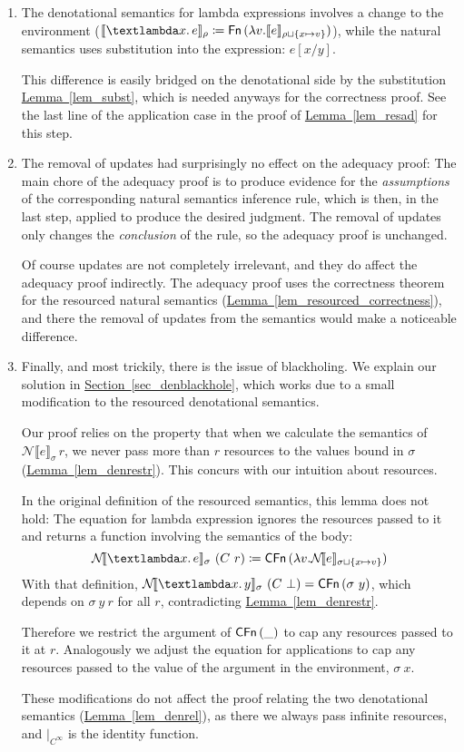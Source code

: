 \documentclass{jfp1}
\newcommand{\myref}[2]{\hyperref[#2]{#1~\ref*{#2}}}
\theoremstyle{nonumberbreak}
\newcommand{\sFn}[1]{\text{\textsf{Fn}}\,(#1)}
\newcommand{\sCFn}[1]{\text{\textsf{CFn}}\,(#1)}
\newcommand{\sLam}[2]{\text{\textlambda} #1.\, #2}
\newcommand{\dsem}[2]{\llbracket #1 \rrbracket_{#2}}
\newcommand{\dsemr}[2]{\mathcal N\!\llbracket #1 \rrbracket_{#2}}
\begin{document}
\begin{enumerate}
\item The denotational semantics for lambda expressions involves a change to the environment ($\dsem{\sLam x e}\rho \coloneqq \sFn{\lambda v. \dsem e {\rho \sqcup \{x \mapsto v\}}}$), while the natural semantics uses substitution into the expression: $e[x/y]$.

This difference is easily bridged on the denotational side by the substitution \myref{Lemma}{lem_subst}, which is needed anyways for the correctness proof. See the last line of the application case in the proof of \myref{Lemma}{lem_resad} for this step.

\item The removal of updates had surprisingly no effect on the adequacy proof: The main chore of the adequacy proof is to produce evidence for the \emph{assumptions} of the corresponding natural semantics inference rule, which is then, in the last step, applied to produce the desired judgment. The removal of updates only changes the \emph{conclusion} of the rule, so the adequacy proof is unchanged.

Of course updates are not completely irrelevant, and they do affect the adequacy proof indirectly. The adequacy proof uses the correctness theorem for the resourced natural semantics (\myref{Lemma}{lem_resourced_correctness}), and there the removal of updates from the semantics would make a noticeable difference.

\item Finally, and most trickily, there is the issue of blackholing. We explain our solution in \myref{Section}{sec_denblackhole}, which works due to a small modification to the resourced denotational semantics.

Our proof relies on the property that when we calculate the semantics of $\dsemr{e}\sigma\,r$, we never pass more than $r$ resources to the values bound in $\sigma$ (\myref{Lemma}{lem_denrestr}). This concurs with our intuition about resources.

In the original definition of the resourced semantics, this lemma does not hold: The equation for lambda expression ignores the resources passed to it and returns a function involving the semantics of the body:
\[
\dsemr{\sLam x e}\sigma ~ (C~r) \coloneqq \sCFn{\lambda v. \dsemr e {\sigma \sqcup \{x \mapsto v\}}}
\]
With that definition, $\dsemr{\sLam x y}\sigma~(C~\bot) = \sCFn{\sigma~y}$, which depends on $\sigma~y~r$ for all $r$, contradicting \myref{Lemma}{lem_denrestr}.

Therefore we restrict the argument of $\sCFn \_$ to cap any resources passed to it at $r$. Analogously we adjust the equation for applications to cap any resources passed to the value of the argument in the environment, $\sigma~x$.

These modifications do not affect the proof relating the two denotational semantics (\myref{Lemma}{lem_denrel}), as there we always pass infinite resources, and $|_{C^\infty}$ is the identity function.

\end{enumerate}
\end{document}
